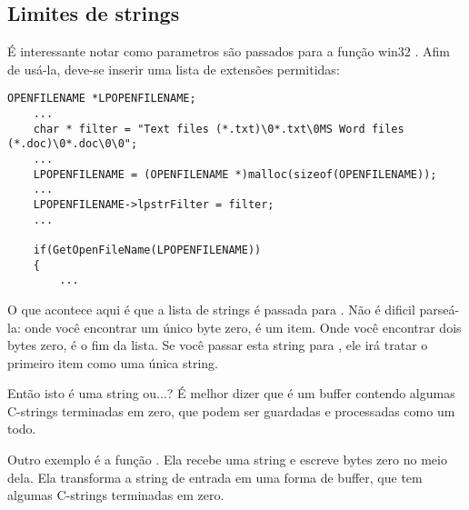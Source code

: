 \subsection{Limites de strings}

É interessante notar como parametros são passados para a função win32 .
Afim de usá-la, deve-se inserir uma lista de extensões permitidas:

\begin{lstlisting}[style=customc]
    OPENFILENAME *LPOPENFILENAME;
    ...
    char * filter = "Text files (*.txt)\0*.txt\0MS Word files (*.doc)\0*.doc\0\0";
    ...
    LPOPENFILENAME = (OPENFILENAME *)malloc(sizeof(OPENFILENAME));
    ...
    LPOPENFILENAME->lpstrFilter = filter;
    ...

    if(GetOpenFileName(LPOPENFILENAME))
    {
        ...
\end{lstlisting}

O que acontece aqui é que a lista de strings é passada para .
Não é dificil parseá-la: onde você encontrar um único byte zero, é um item.
Onde você encontrar dois bytes zero, é o fim da lista.
Se você passar esta string para \printf, ele irá tratar o primeiro item como uma única string.

Então isto é uma string ou...?
É melhor dizer que é um buffer contendo algumas C-strings terminadas em zero, que podem ser guardadas e 
processadas como um todo.

Outro exemplo é a função . Ela recebe uma string e escreve bytes zero no meio dela.
Ela transforma a string de entrada em uma forma de buffer, que tem algumas C-strings terminadas em zero.

